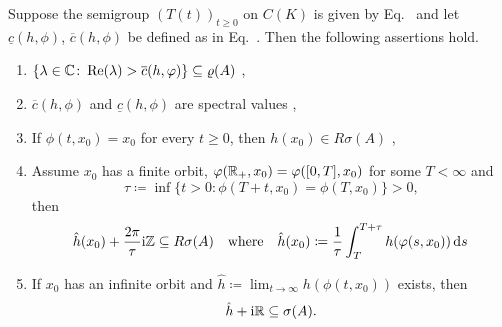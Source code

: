 \begin{proposition}\label{prop:b3-4.8}
Suppose the semigroup $(T(t))_{t\geq 0}$ on $C(K)$ is given by 
Eq.~ and let $\underline{c}(h,\phi)$, $\overline{c}(h,\phi)$ be defined as in Eq.~.
Then the following assertions hold.
\begin{enumerate}[\upshape (i)]
\item 
	$\{\lambda \in \C \colon \Re(\lambda) > \overline{c}(h,\phi)\} \subseteq \rho(A)$ , 
		
\item 
	$\overline{c}(h,\phi)$ and $\underline{c}(h,\phi)$ are spectral values , 
		
\item 
	If\/ $\phi(t,x_{0}) = x_{0}$ for every $t \geq 0$, then $h(x_{0}) \in R{\sigma}(A)$ , 
		
\item 
Assume $x_{0}$ has a finite orbit, \ie $\phi(\R_{+},x_{0}) = \phi([0,T],x_{0})$ for some $T < \infty$ and 
\[
\tau \coloneq \inf\{t > 0 \colon \phi(T+t,x_{0}) = \phi(T,x_{0})\} > 0, 
\]
then 
\[
\hat{h}(x_{0}) + \frac{2\pi}{\tau}\im\Z \subseteq R{\sigma}(A)\quad\text{where}\quad \hat{h}(x_{0}) \coloneq \frac{1}{\tau}\int_{T}^{T+\tau}h(\phi(s,x_{0}))\ds\,
\]
		
\item 
	If\/ $x_{0}$ has an infinite orbit and 
	$\hat{h} \coloneq  \lim_{t\to\infty}h(\phi(t,x_{0}))$ exists, then 
    \[
    \hat{h} + \mathrm{i}\mathbb{R} \subseteq \sigma(A) .
    \]
\end{enumerate}
\end{proposition}
